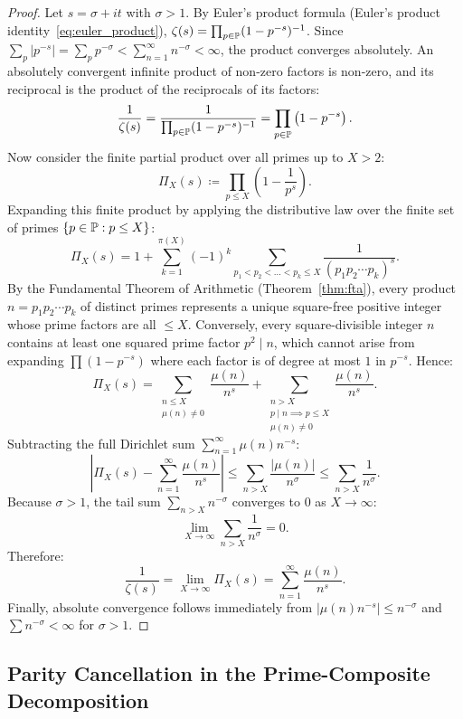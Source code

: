 \begin{proof}
\leanok
Let $s = \sigma + i t$ with $\sigma > 1$. By Euler's product formula (Euler's product identity~\eqref{eq:euler_product}), $\zeta(s) = \prod_{p \in \mathbb{P}} (1 - p^{-s})^{-1}$. Since $\sum_{p} |p^{-s}| = \sum_{p} p^{-\sigma} < \sum_{n=1}^\infty n^{-\sigma} < \infty$, the product converges absolutely. An absolutely convergent infinite product of non-zero factors is non-zero, and its reciprocal is the product of the reciprocals of its factors:
$$\frac{1}{\zeta(s)} = \frac{1}{\prod_{p \in \mathbb{P}} (1 - p^{-s})^{-1}} = \prod_{p \in \mathbb{P}} \left(1 - p^{-s}\right).$$
Now consider the finite partial product over all primes up to $X > 2$:
$$\Pi_X(s) \coloneqq \prod_{p \le X} \left(1 - \frac{1}{p^s}\right).$$
Expanding this finite product by applying the distributive law over the finite set of primes $\{p \in \mathbb{P} : p \le X\}$:
$$\Pi_X(s) = 1 + \sum_{k=1}^{\pi(X)} (-1)^k \sum_{p_1 < p_2 < \dots < p_k \le X} \frac{1}{(p_1 p_2 \cdots p_k)^s}.$$
By the Fundamental Theorem of Arithmetic (Theorem~\ref{thm:fta}), every product $n = p_1 p_2 \cdots p_k$ of distinct primes represents a unique square-free positive integer whose prime factors are all $\le X$. Conversely, every square-divisible integer $n$ contains at least one squared prime factor $p^2 \mid n$, which cannot arise from expanding $\prod (1 - p^{-s})$ where each factor is of degree at most $1$ in $p^{-s}$. Hence:
$$\Pi_X(s) = \sum_{\substack{n \le X \\ \mu(n) \neq 0}} \frac{\mu(n)}{n^s} + \sum_{\substack{n > X \\ p \mid n \implies p \le X \\ \mu(n) \neq 0}} \frac{\mu(n)}{n^s}.$$
Subtracting the full Dirichlet sum $\sum_{n=1}^\infty \mu(n) n^{-s}$:
$$\left| \Pi_X(s) - \sum_{n=1}^\infty \frac{\mu(n)}{n^s} \right| \le \sum_{n > X} \frac{|\mu(n)|}{n^\sigma} \le \sum_{n > X} \frac{1}{n^\sigma}.$$
Because $\sigma > 1$, the tail sum $\sum_{n > X} n^{-\sigma}$ converges to $0$ as $X \to \infty$:
$$\lim_{X \to \infty} \sum_{n > X} \frac{1}{n^\sigma} = 0.$$
Therefore:
$$\frac{1}{\zeta(s)} = \lim_{X \to \infty} \Pi_X(s) = \sum_{n=1}^\infty \frac{\mu(n)}{n^s}.$$
Finally, absolute convergence follows immediately from $|\mu(n) n^{-s}| \le n^{-\sigma}$ and $\sum n^{-\sigma} < \infty$ for $\sigma > 1$.
\end{proof}

\subsection{Parity Cancellation in the Prime-Composite Decomposition}

